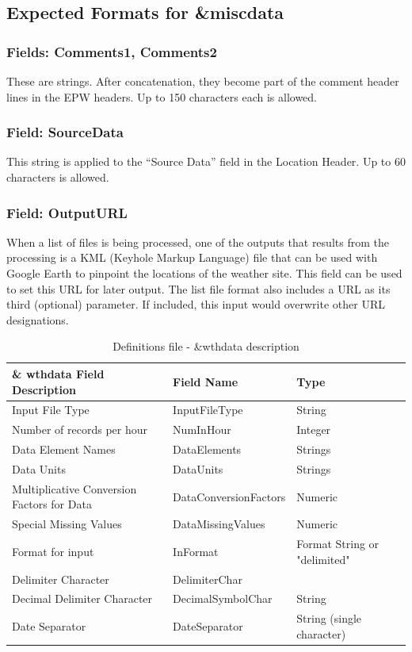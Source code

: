 \subsection{Expected Formats for \&miscdata}\label{expected-formats-for-miscdata}

\subsubsection{Fields: Comments1, Comments2}\label{fields-comments1-comments2}

These are strings. After concatenation, they become part of the comment header lines in the EPW headers. Up to 150 characters each is allowed.

\subsubsection{Field: SourceData}\label{field-sourcedata}

This string is applied to the ``Source Data'' field in the Location Header. Up to 60 characters is allowed.

\subsubsection{Field: OutputURL}\label{field-outputurl}

When a list of files is being processed, one of the outputs that results from the processing is a KML (Keyhole Markup Language) file that can be used with Google Earth to pinpoint the locations of the weather site. This field can be used to set this URL for later output. The list file format also includes a URL as its third (optional) parameter. If included, this input would overwrite other URL designations.

\begin{longtable}[c]{p{2.71in}p{1.5in}p{1.79in}}
\caption{Definitions file - \&wthdata description \protect \label{table:definitions-file-wthdata-description}}\\
\toprule 
\& wthdata Field Description & Field Name & Type \tabularnewline \midrule
\endhead
Input File Type & InputFileType & String \tabularnewline
Number of records per hour & NumInHour & Integer \tabularnewline
Data Element Names & DataElements & Strings \tabularnewline
Data Units & DataUnits & Strings \tabularnewline
Multiplicative Conversion Factors for Data & DataConversionFactors & Numeric \tabularnewline
Special Missing Values & DataMissingValues & Numeric \tabularnewline
Format for input & InFormat & Format String or "delimited" \tabularnewline
Delimiter Character & DelimiterChar &  \tabularnewline
Decimal Delimiter Character & DecimalSymbolChar & String \tabularnewline
Date Separator & DateSeparator & String (single character) \tabularnewline
\bottomrule
\end{longtable}

